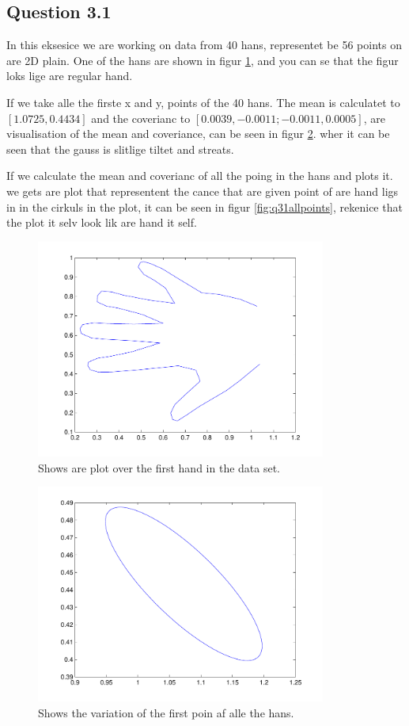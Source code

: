 \subsection*{Question 3.1}
In this eksesice we are working on data from 40 hans, representet be 56
points on are 2D plain. One of the hans are shown in figur
\ref{fig:q31hand}, and you can se that the figur loks lige are regular
hand. 

If we take alle the firste x and y, points of the 40 hans. The mean is
calculatet to $[1.0725, 0.4434]$ and the coverianc to $[0.0039, -0.0011;
-0.0011, 0.0005]$, are visualisation of the mean and coveriance, can be
seen in figur \ref{fig:q31onepoint}. wher it can be seen that the gauss
is slitlige tiltet and streats.

If we calculate the mean and coverianc of all the poing in the hans and
plots it. we gets are plot that representent the cance that are given
point of are hand ligs in in the cirkuls in the plot, it can be seen in
figur \ref{fig:q31allpoints}, rekenice that the plot it selv look lik
are hand it self.

\begin{figure}[!htbp]
  \centering
  \includegraphics[width=0.85\textwidth]{./images/q31_hand}
  \caption{Shows are plot over the first hand in the data set.}
  \label{fig:q31hand}
\end{figure}

\begin{figure}[!htbp]
  \centering
  \includegraphics[width=0.85\textwidth]{./images/q31_2}
  \caption{Shows the variation of the first poin af alle the hans.}
  \label{fig:q31onepoint}
\end{figure}

